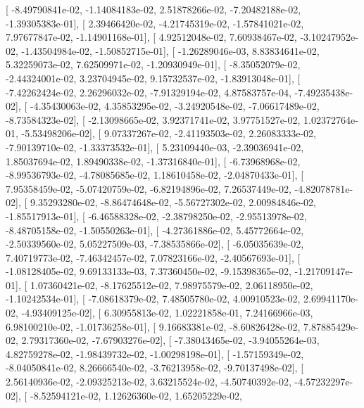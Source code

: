 \documentclass{article}
\begin{document}
       [ -8.49790841e-02,  -1.14084183e-02,   2.51878266e-02,
         -7.20482188e-02,  -1.39305383e-01],
       [  2.39466420e-02,  -4.21745319e-02,  -1.57841021e-02,
          7.97677847e-02,  -1.14901168e-01],
       [  4.92512048e-02,   7.60938467e-02,  -3.10247952e-02,
         -1.43504984e-02,  -1.50852715e-01],
       [ -1.26289046e-03,   8.83834641e-02,   5.32259073e-02,
          7.62509971e-02,  -1.20930949e-01],
       [ -8.35052079e-02,  -2.44324001e-02,   3.23704945e-02,
          9.15732537e-02,  -1.83913048e-01],
       [ -7.42262424e-02,   2.26296032e-02,  -7.91329194e-02,
          4.87583757e-04,  -7.49235438e-02],
       [ -4.35430063e-02,   4.35853295e-02,  -3.24920548e-02,
         -7.06617489e-02,  -8.73584323e-02],
       [ -2.13098665e-02,   3.92371741e-02,   3.97751527e-02,
          1.02372764e-01,  -5.53498206e-02],
       [  9.07337267e-02,  -2.41193503e-02,   2.26083333e-02,
         -7.90139710e-02,  -1.33373532e-01],
       [  5.23109440e-03,  -2.39036941e-02,   1.85037694e-02,
          1.89490338e-02,  -1.37316840e-01],
       [ -6.73968968e-02,  -8.99536793e-02,  -4.78085685e-02,
          1.18610458e-02,  -2.04870433e-01],
       [  7.95358459e-02,  -5.07420759e-02,  -6.82194896e-02,
          7.26537449e-02,  -4.82078781e-02],
       [  9.35293280e-02,  -8.86474648e-02,  -5.56727302e-02,
          2.00984846e-02,  -1.85517913e-01],
       [ -6.46588328e-02,  -2.38798250e-02,  -2.95513978e-02,
         -8.48705158e-02,  -1.50550263e-01],
       [ -4.27361886e-02,   5.45772664e-02,  -2.50339560e-02,
          5.05227509e-03,  -7.38535866e-02],
       [ -6.05035639e-02,   7.40719773e-02,  -7.46342457e-02,
          7.07823166e-02,  -2.40567693e-01],
       [ -1.08128405e-02,   9.69133133e-03,   7.37360450e-02,
         -9.15398365e-02,  -1.21709147e-01],
       [  1.07360421e-02,  -8.17625512e-02,   7.98975579e-02,
          2.06118950e-02,  -1.10242534e-01],
       [ -7.08618379e-02,   7.48505780e-02,   4.00910523e-02,
          2.69941170e-02,  -4.93409125e-02],
       [  6.30955813e-02,   1.02221858e-01,   7.24166966e-03,
          6.98100210e-02,  -1.01736258e-01],
       [  9.16683381e-02,  -8.60826428e-02,   7.87885429e-02,
          2.79317360e-02,  -7.67903276e-02],
       [ -7.38043465e-02,  -3.94055264e-03,   4.82759278e-02,
         -1.98439732e-02,  -1.00298198e-01],
       [ -1.57159349e-02,  -8.04050841e-02,   8.26666540e-02,
         -3.76213958e-02,  -9.70137498e-02],
       [  2.56140936e-02,  -2.09325213e-02,   3.63215524e-02,
         -4.50740392e-02,  -4.57232297e-02],
       [ -8.52594121e-02,   1.12626360e-02,   1.65205229e-02,
\end{document}

